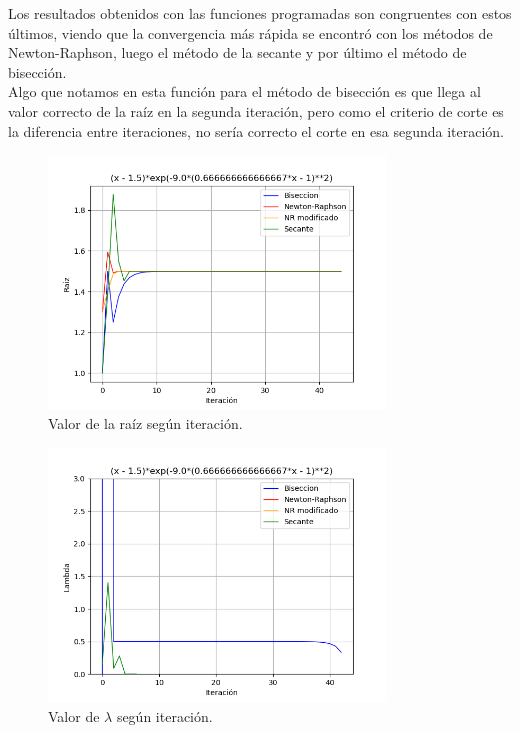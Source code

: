\documentclass[titlepage,a4paper]{article}
\begin{document}
Los resultados obtenidos con las funciones programadas son congruentes con estos últimos, viendo que la convergencia más rápida se encontró con los métodos de Newton-Raphson, luego el método de la secante y por último el método de bisección. 
\\Algo que notamos en esta función para el método de bisección es que llega al valor correcto de la raíz en la segunda iteración, pero como el criterio de corte es la diferencia entre iteraciones, no sería correcto el corte en esa segunda iteración.


\begin{figure}[H]
    \centering
    \includegraphics[width=0.8\textwidth]{raiz f3.png}
    \caption{\label{fig:class01}Valor de la raíz según iteración.}
\end{figure}

\begin{figure}[H]
    \centering
    \includegraphics[width=0.8\textwidth]{lambda f3.png}
    \caption{\label{fig:class01}Valor de $\lambda$ según iteración.}
\end{figure}
\end{document}
